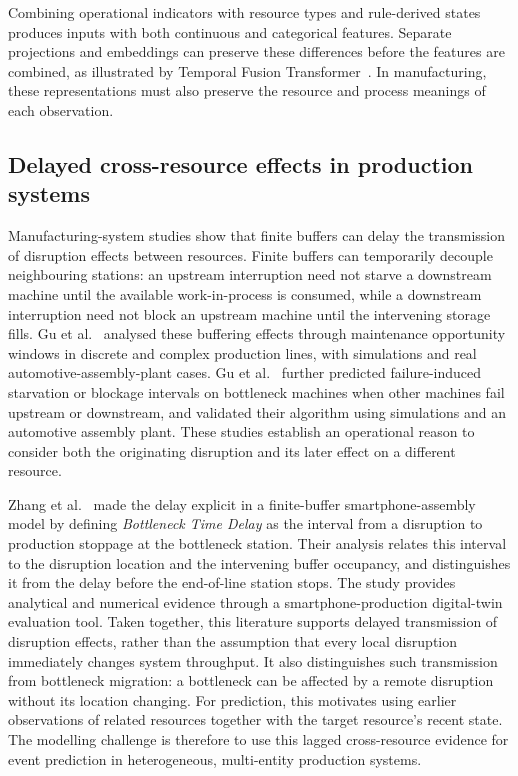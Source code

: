 \documentclass[a4paper,fleqn]{cas-dc}
\begin{document}
Combining operational indicators with resource types and rule-derived states produces inputs with both continuous and categorical features. Separate projections and embeddings can preserve these differences before the features are combined, as illustrated by Temporal Fusion Transformer~\cite{lim2021tft}. In manufacturing, these representations must also preserve the resource and process meanings of each observation.

\subsection{Delayed cross-resource effects in production systems}\label{sec:manufacturing-delay}

Manufacturing-system studies show that finite buffers can delay the transmission of disruption effects between resources. Finite buffers can temporarily decouple neighbouring stations: an upstream interruption need not starve a downstream machine until the available work-in-process is consumed, while a downstream interruption need not block an upstream machine until the intervening storage fills. Gu et al.~\cite{gu2013hidden} analysed these buffering effects through maintenance opportunity windows in discrete and complex production lines, with simulations and real automotive-assembly-plant cases. Gu et al.~\cite{gu2015passive} further predicted failure-induced starvation or blockage intervals on bottleneck machines when other machines fail upstream or downstream, and validated their algorithm using simulations and an automotive assembly plant. These studies establish an operational reason to consider both the originating disruption and its later effect on a different resource.

Zhang et al.~\cite{zhang2022vulnerability} made the delay explicit in a finite-buffer smartphone-assembly model by defining \emph{Bottleneck Time Delay} as the interval from a disruption to production stoppage at the bottleneck station. Their analysis relates this interval to the disruption location and the intervening buffer occupancy, and distinguishes it from the delay before the end-of-line station stops. The study provides analytical and numerical evidence through a smartphone-production digital-twin evaluation tool. Taken together, this literature supports delayed transmission of disruption effects, rather than the assumption that every local disruption immediately changes system throughput. It also distinguishes such transmission from bottleneck migration: a bottleneck can be affected by a remote disruption without its location changing. For prediction, this motivates using earlier observations of related resources together with the target resource's recent state. The modelling challenge is therefore to use this lagged cross-resource evidence for event prediction in heterogeneous, multi-entity production systems.
\end{document}
